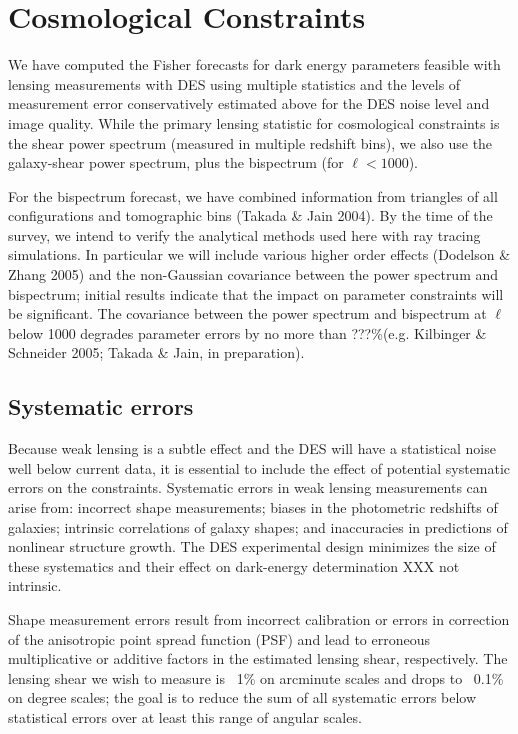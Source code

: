 \documentclass[preprint]{aastex}
\begin{document}
\section{Cosmological Constraints}

We have computed the Fisher forecasts for dark energy parameters
feasible with lensing measurements with DES using multiple statistics
and the levels of measurement error conservatively estimated above for
the DES noise level and image quality. While the primary
lensing statistic for cosmological constraints is the shear power
spectrum (measured in multiple 
redshift bins), we also use the galaxy-shear power spectrum,  plus
the bispectrum (for $\ell<1000$).

For the bispectrum forecast, we have combined information from
triangles of all configurations and tomographic bins (Takada \& Jain
2004). By the time of the survey, we intend to verify the analytical
methods used here with ray tracing simulations. In particular we
will include various higher order effects (Dodelson \& Zhang 2005)
and the non-Gaussian covariance between the power spectrum and
bispectrum; initial results indicate that the impact on parameter
constraints will be significant. The covariance between the power
spectrum and bispectrum at $\ell$ below 1000 degrades parameter errors
by no more than ???\%(e.g. Kilbinger \& Schneider 2005; Takada \&
Jain, in preparation). 


\subsection{Systematic errors} \label{sec:systematics}

Because weak lensing is a subtle effect and the DES will have a
statistical noise well below current data, it is essential to include
the effect of potential systematic errors on the constraints. 
Systematic errors in weak lensing measurements can arise from:
incorrect shape measurements; biases in the photometric redshifts
of galaxies; intrinsic correlations of galaxy shapes; and inaccuracies
in predictions of nonlinear structure growth. The DES experimental
design minimizes the size of these systematics and their effect on
dark-energy determination {\color{red} XXX not intrinsic}.

Shape measurement errors result from incorrect
calibration or errors in correction of the anisotropic point spread
function (PSF) and lead to erroneous multiplicative or additive
factors in the estimated lensing shear, respectively. The lensing
shear we wish to measure is ~1\% on arcminute scales and drops to
~0.1\% on degree scales; the goal is to reduce the sum of all
systematic errors below statistical errors over at least this range
of angular scales.
\end{document}
